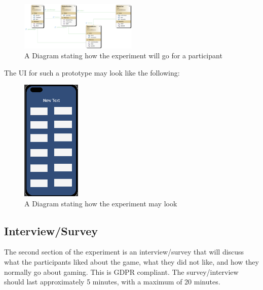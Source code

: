 \documentclass[conference]{IEEEtran}
\begin{document}
\begin{figure}[H]
\includegraphics[width = 0.5\textwidth]{UMLProcess}
\caption{A Diagram stating how the experiment will go for a participant}
\label{figure3}
\end{figure}
The UI for such a prototype may look like the following:

\begin{figure}[H]
\begin{center}
\includegraphics[width = 0.25\textwidth, ]{Sim1}
\caption{A Diagram stating how the experiment may look}
\label{figure1}
\end{center}
\end{figure}

\subsection{Interview/Survey}
The second section of the experiment is an interview/survey that will discuss what the participants liked about the game, what they did not like, and how they normally go about gaming. This is GDPR compliant. The survey/interview should last approximately 5 minutes, with a maximum of 20 minutes.
\end{document}
